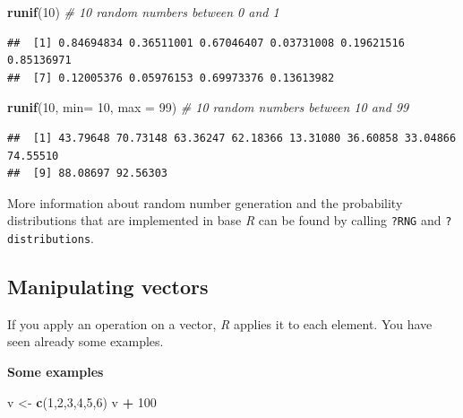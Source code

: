 \documentclass[
]{scrartcl}
\makeatletter
\newenvironment{Shaded}{\begin{snugshade}}{\end{snugshade}}
\newcommand{\AttributeTok}[1]{\textcolor[rgb]{0.13,0.29,0.53}{#1}}
\newcommand{\CommentTok}[1]{\textcolor[rgb]{0.56,0.35,0.01}{\textit{#1}}}
\newcommand{\DecValTok}[1]{\textcolor[rgb]{0.00,0.00,0.81}{#1}}
\newcommand{\FunctionTok}[1]{\textcolor[rgb]{0.13,0.29,0.53}{\textbf{#1}}}
\newcommand{\NormalTok}[1]{#1}
\newcommand{\OtherTok}[1]{\textcolor[rgb]{0.56,0.35,0.01}{#1}}
\newcommand{\SpecialCharTok}[1]{\textcolor[rgb]{0.81,0.36,0.00}{\textbf{#1}}}
\newenvironment{kframe}{%
\medskip{}
\setlength{\fboxsep}{.8em}
 \def\at@end@of@kframe{}%
 \ifinner\ifhmode%
  \def\at@end@of@kframe{\end{minipage}}%
  \begin{minipage}{\columnwidth}%
 \fi\fi%
 \def\FrameCommand##1{\hskip\@totalleftmargin \hskip-\fboxsep
 \colorbox{shadecolor}{##1}\hskip-\fboxsep
     \hskip-\linewidth \hskip-\@totalleftmargin \hskip\columnwidth}%
 \MakeFramed {\advance\hsize-\width
   \@totalleftmargin\z@ \linewidth\hsize
   \@setminipage}}%
 {\par\unskip\endMakeFramed%
 \at@end@of@kframe}
\newenvironment{rmdblock}[1]
  {
  \begin{itemize}
  \renewcommand{\labelitemi}{
    \raisebox{-.7\height}[0pt][0pt]{
      {\setkeys{Gin}{width=3em,keepaspectratio}\texttt{[image: images/\#1]}}
    }
  }
  \setlength{\fboxsep}{1em}
  \begin{kframe}
  \item
  }
  {
  \end{kframe}
  \end{itemize}
  }
\newenvironment{geek}
    {\begin{rmdblock}{geek}}
    {\end{rmdblock}}
\newenvironment{webexsolution}[1]
    {\par\tiny\textbf{#1}}
    {\par}
\newcommand{\webexhide}[1]{\begin{webexsolution}{#1}}
\makeatother
\begin{document}
\begin{Shaded}
\begin{Highlighting}[]
\FunctionTok{runif}\NormalTok{(}\DecValTok{10}\NormalTok{)                     }\CommentTok{\# 10 random numbers between 0 and 1}
\end{Highlighting}
\end{Shaded}

\begin{verbatim}
##  [1] 0.84694834 0.36511001 0.67046407 0.03731008 0.19621516 0.85136971
##  [7] 0.12005376 0.05976153 0.69973376 0.13613982
\end{verbatim}

\begin{Shaded}
\begin{Highlighting}[]
\FunctionTok{runif}\NormalTok{(}\DecValTok{10}\NormalTok{, }\AttributeTok{min=} \DecValTok{10}\NormalTok{, }\AttributeTok{max =} \DecValTok{99}\NormalTok{)  }\CommentTok{\# 10 random numbers between 10 and 99}
\end{Highlighting}
\end{Shaded}

\begin{verbatim}
##  [1] 43.79648 70.73148 63.36247 62.18366 13.31080 36.60858 33.04866 74.55510
##  [9] 88.08697 92.56303
\end{verbatim}

\begin{geek}
More information about random number generation and the probability
distributions that are implemented in base \emph{R} can be found by
calling \texttt{?RNG} and \texttt{?distributions}.
\end{geek}

\subsection{Manipulating vectors}\label{manipulating-vectors}

If you apply an operation on a vector, \emph{R} applies it to each element. You have seen already some examples.

\webexhide{Some examples}

\begin{Shaded}
\begin{Highlighting}[]
\NormalTok{v }\OtherTok{\textless{}{-}} \FunctionTok{c}\NormalTok{(}\DecValTok{1}\NormalTok{,}\DecValTok{2}\NormalTok{,}\DecValTok{3}\NormalTok{,}\DecValTok{4}\NormalTok{,}\DecValTok{5}\NormalTok{,}\DecValTok{6}\NormalTok{)}
\NormalTok{v }\SpecialCharTok{+} \DecValTok{100}
\end{Highlighting}
\end{Shaded}
\end{document}
